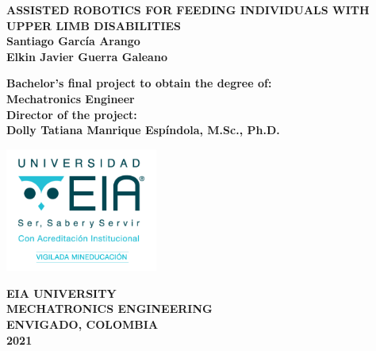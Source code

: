 \documentclass[11pt]{report} %
\begin{document}
\begin{titlepage}
\begin{center}

\begin{Large}

\vspace*{1cm}
\textbf{ASSISTED ROBOTICS FOR FEEDING INDIVIDUALS WITH UPPER LIMB DISABILITIES}\\[3.5cm]

\textbf{Santiago García Arango}\\
\textbf{Elkin Javier Guerra Galeano}\\[2cm]

\end{Large}

\begin{large}

\textbf{Bachelor's final project to obtain the degree of:}\\
\textbf{Mechatronics Engineer}\\[2cm]

\textbf{Director of the project:}\\
\textbf{Dolly Tatiana Manrique Espíndola, M.Sc., Ph.D.}\\[1cm]

\end{large}

\vfill

\includegraphics[width=5cm]{assets/imgs/logoeia.png}\\

\begin{large}
\textbf{EIA UNIVERSITY}\\
\textbf{MECHATRONICS ENGINEERING}\\
\textbf{ENVIGADO, COLOMBIA}\\
\textbf{2021}\\
\end{large}

\end{center}
\end{titlepage}

\end{document}
